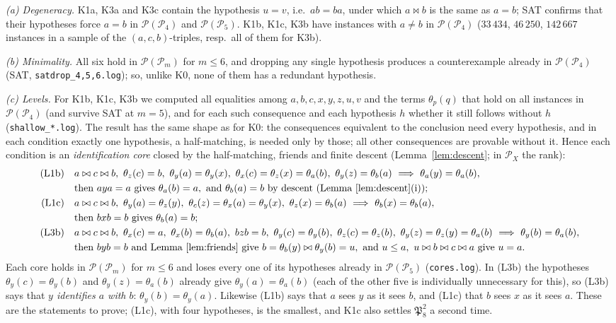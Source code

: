 \documentclass[11pt]{amsart}
\theoremstyle{definition}
\renewcommand{\P}{\mathcal{P}}
\newcommand{\mt}{\bowtie}   %
\begin{document}
\emph{(a) Degeneracy.} K1a, K3a and K3c contain the hypothesis $u=v$, i.e.\ $ab=ba$, under which $a\mt b$ is the same as $a=b$; SAT confirms that their hypotheses force $a=b$ in $\P(\P_4)$ and $\P(\P_5)$. K1b, K1c, K3b have instances with $a\ne b$ in $\P(\P_4)$ ($33\,434$, $46\,250$, $142\,667$ instances in a sample of the $(a,c,b)$-triples, resp.\ all of them for K3b).

\emph{(b) Minimality.} All six hold in $\P(\P_m)$ for $m\le6$, and dropping any single hypothesis produces a counterexample already in $\P(\P_4)$ (SAT, \texttt{satdrop\_4,5,6.log}); so, unlike K0, none of them has a redundant hypothesis.

\emph{(c) Levels.} For K1b, K1c, K3b we computed all equalities among $a,b,c,x,y,z,u,v$ and the terms $\theta_p(q)$ that hold on all instances in $\P(\P_4)$ (and survive SAT at $m=5$), and for each such consequence and each hypothesis $h$ whether it still follows without $h$ (\texttt{shallow\_*.log}). The result has the same shape as for K0: the consequences equivalent to the conclusion need every hypothesis, and in each condition exactly one hypothesis, a half-matching, is needed only by those; all other consequences are provable without it. Hence each condition is an \emph{identification core} closed by the half-matching, friends and finite descent (Lemma~\ref{lem:descent}; in $\P_X$ the rank):
\begin{align*}
\text{(L1b)}\quad& a\mt c\mt b,\ \theta_z(c)=b,\ \theta_y(a)=\theta_y(x),\ \theta_x(c)=\theta_z(x)=\theta_a(b),\ \theta_y(z)=\theta_b(a)\ \Longrightarrow\ \theta_a(y)=\theta_a(b),\\
&\text{then } aya=a \text{ gives } \theta_a(b)=a, \text{ and } \theta_b(a)=b \text{ by descent (Lemma~\ref{lem:descent}(i))};\\
\text{(L1c)}\quad& a\mt c\mt b,\ \theta_y(a)=\theta_z(y),\ \theta_c(z)=\theta_x(a)=\theta_y(x),\ \theta_z(x)=\theta_b(a)\ \Longrightarrow\ \theta_b(x)=\theta_b(a),\\
&\text{then } bxb=b \text{ gives } \theta_b(a)=b;\\
\text{(L3b)}\quad& a\mt c\mt b,\ \theta_x(c)=a,\ \theta_x(b)=\theta_b(a),\ bzb=b,\ \theta_y(c)=\theta_y(b),\ \theta_z(c)=\theta_z(b),\ \theta_y(z)=\theta_z(y)=\theta_a(b)\ \Longrightarrow\ \theta_y(b)=\theta_a(b),\\
&\text{then } byb=b \text{ and Lemma~\ref{lem:friends} give } b=\theta_b(y)\mt\theta_y(b)=u, \text{ and } u\le a,\ u\mt b\mt c\mt a \text{ give } u=a.
\end{align*}
Each core holds in $\P(\P_m)$ for $m\le6$ and loses every one of its hypotheses already in $\P(\P_5)$ (\texttt{cores.log}). In (L3b) the hypotheses $\theta_y(c)=\theta_y(b)$ and $\theta_y(z)=\theta_a(b)$ already give $\theta_y(a)=\theta_a(b)$ (each of the other five is individually unnecessary for this), so (L3b) says that \emph{$y$ identifies $a$ with $b$}: $\theta_y(b)=\theta_y(a)$. Likewise (L1b) says that $a$ sees $y$ as it sees $b$, and (L1c) that $b$ sees $x$ as it sees $a$. These are the statements to prove; (L1c), with four hypotheses, is the smallest, and K1c also settles $\mathfrak P_8^2$ a second time.
\end{document}
